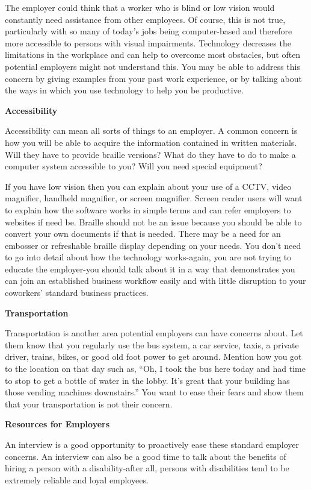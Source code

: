 The employer could think that a worker who is blind or low vision would constantly need assistance from other employees. Of course, this is not true, particularly with so many of today's jobs being computer-based and therefore more accessible to persons with visual impairments. Technology decreases the limitations in the workplace and can help to overcome most obstacles, but often potential employers might not understand this. You may be able to address this concern by giving examples from your past work experience, or by talking about the ways in which you use technology to help you be productive.

\textbf{Accessibility}

Accessibility can mean all sorts of things to an employer. A common concern is how you will be able to acquire the information contained in written materials. Will they have to provide braille versions? What do they have to do to make a computer system accessible to you? Will you need special equipment?

If you have low vision then you can explain about your use of a CCTV, video magnifier, handheld magnifier, or screen magnifier. Screen reader users will want to explain how the software works in simple terms and can refer employers to websites if need be. Braille should not be an issue because you should be able to convert your own documents if that is needed. There may be a need for an embosser or refreshable braille display depending on your needs. You don't need to go into detail about how the technology works-again, you are not trying to educate the employer-you should talk about it in a way that demonstrates you can join an established business workflow easily and with little disruption to your coworkers' standard business practices.

\textbf{Transportation}

Transportation is another area potential employers can have concerns about. Let them know that you regularly use the bus system, a car service, taxis, a private driver, trains, bikes, or good old foot power to get around. Mention how you got to the location on that day such as, ``Oh, I took the bus here today and had time to stop to get a bottle of water in the lobby. It's great that your building has those vending machines downstairs.'' You want to ease their fears and show them that your transportation is not their concern.

\textbf{Resources for Employers}

An interview is a good opportunity to proactively ease these standard employer concerns. An interview can also be a good time to talk about the benefits of hiring a person with a disability-after all, persons with disabilities tend to be extremely reliable and loyal employees.

